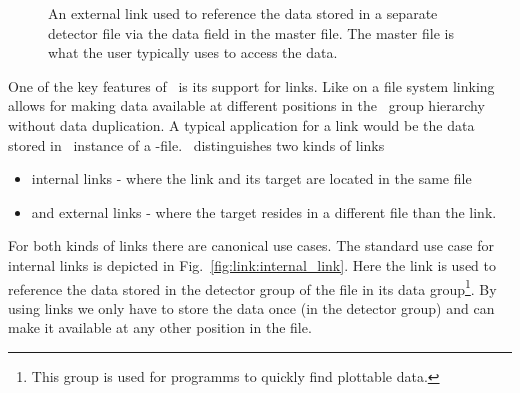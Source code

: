 \begin{figure}
    \caption{{\small\label{fig:link:external_link}
    An external link used to reference the data stored in a separate detector
    file via the data field in the master file. The master file is what the user
    typically uses to access the data. 
    }}
\end{figure}

One of the key features of \nexus\ is its support for links. Like on a file
system linking allows for making data available at different positions in the
\nexus\ group hierarchy without data duplication. 
A typical application for a link would be the data stored in \nxdata\ instance
of a \nexus-file. \nexus\ distinguishes two kinds of links
\begin{itemize}
\item internal links - where the link and its target are located in the same
file
\item and external links - where the target resides in a different file than the 
link.
\end{itemize}
For both kinds of links there are canonical use cases. 
The standard use case for internal links is depicted in
Fig.~\ref{fig:link:internal_link}. Here the link is used to reference the data
stored in the detector group of the file in its data group\footnote{This group
is used for programms to quickly find plottable data.}.
By using links we only have to store the data once (in the detector group) and
can make it available at any other position in the file.


